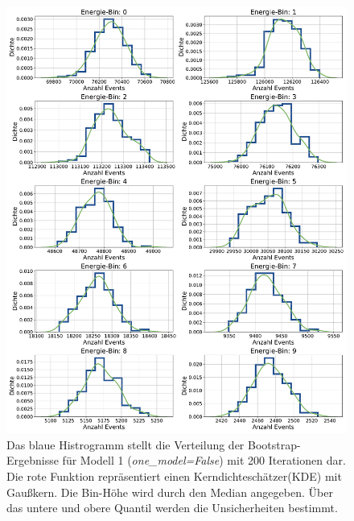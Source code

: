 \begin{figure}%
    \centering%
    \includegraphics[width=\textwidth]{Plots/DSEA/False/class_dist_10bins_12it_75ep_500000samples_200pulls.pdf}%
    \caption[Ergebnisse des Bootstrapping-Vefahrens für das 1. Modell in DSEA]{Das blaue Histrogramm stellt die Verteilung der Bootstrap-Ergebnisse für Modell 1 (\textit{one\_model=False}) mit 200 Iterationen dar.
    Die rote Funktion repräsentiert einen Kerndichteschätzer(KDE) mit Gaußkern.
    Die Bin-Höhe wird durch den Median angegeben.
    Über das untere und obere Quantil werden die Unsicherheiten bestimmt.
    }%
    \label{fig:dsea_bootstrap_false}%
\end{figure}%


